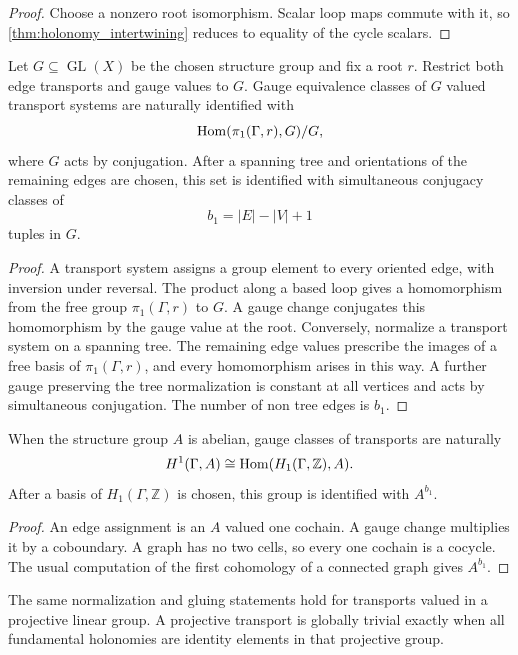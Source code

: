 \begin{proof}
Choose a nonzero root isomorphism.  Scalar loop maps commute with it, so \cref{thm:holonomy_intertwining} reduces to equality of the cycle scalars.
\end{proof}

\begin{theorem}\label{thm:gauge_classification}
Let $G\subseteq\operatorname{GL}(X)$ be the chosen structure group and fix a root $r$.  Restrict both edge transports and gauge values to $G$.  Gauge equivalence classes of $G$ valued transport systems are naturally identified with
\[
\operatorname{Hom}(\pi_1(\Gamma,r),G)/G,
\]
where $G$ acts by conjugation.  After a spanning tree and orientations of the remaining edges are chosen, this set is identified with simultaneous conjugacy classes of
\[
b_1=|E|-|V|+1
\]
tuples in $G$.
\end{theorem}

\begin{proof}
A transport system assigns a group element to every oriented edge, with inversion under reversal.  The product along a based loop gives a homomorphism from the free group $\pi_1(\Gamma,r)$ to $G$.  A gauge change conjugates this homomorphism by the gauge value at the root.  Conversely, normalize a transport system on a spanning tree.  The remaining edge values prescribe the images of a free basis of $\pi_1(\Gamma,r)$, and every homomorphism arises in this way.  A further gauge preserving the tree normalization is constant at all vertices and acts by simultaneous conjugation.  The number of non tree edges is $b_1$.
\end{proof}

\begin{corollary}\label{cor:abelian_holonomy_class}
When the structure group $A$ is abelian, gauge classes of transports are naturally
\[
H^1(\Gamma,A)
\cong
\operatorname{Hom}(H_1(\Gamma,\mathbb Z),A).
\]
After a basis of $H_1(\Gamma,\mathbb Z)$ is chosen, this group is identified with $A^{b_1}$.
\end{corollary}

\begin{proof}
An edge assignment is an $A$ valued one cochain.  A gauge change multiplies it by a coboundary.  A graph has no two cells, so every one cochain is a cocycle.  The usual computation of the first cohomology of a connected graph gives $A^{b_1}$.
\end{proof}

\begin{corollary}\label{cor:projective_transport}
The same normalization and gluing statements hold for transports valued in a projective linear group.  A projective transport is globally trivial exactly when all fundamental holonomies are identity elements in that projective group.
\end{corollary}

